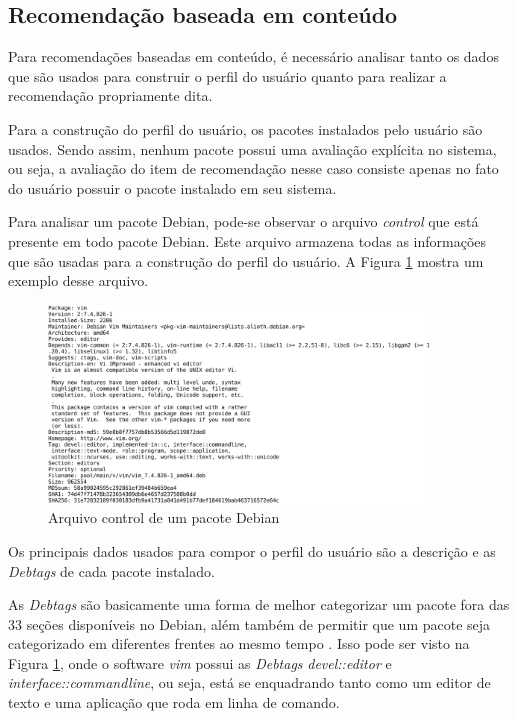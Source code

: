 \subsection{Recomendação baseada em conteúdo}

Para recomendações baseadas em conteúdo, é necessário analisar tanto os dados
que são usados para construir o perfil do usuário quanto para realizar a
recomendação propriamente dita.

Para a construção do perfil do usuário, os pacotes instalados pelo usuário são
usados. Sendo assim, nenhum pacote possui uma avaliação explícita no sistema,
ou seja, a avaliação do item de recomendação nesse caso consiste apenas no fato
do usuário possuir o pacote instalado em seu sistema.

Para analisar um pacote Debian, pode-se observar o arquivo \textit{control} que
está presente em todo pacote Debian. Este arquivo
armazena todas as informações que são usadas para a construção do perfil do
usuário. A Figura \ref{fig:control_pacote} mostra um exemplo desse arquivo.

\begin{figure}[h]
  \centering
  \includegraphics[width=0.9\textwidth]{figuras/control_pacote.eps}
  \caption{Arquivo control de um pacote Debian}
  \label{fig:control_pacote}
\end{figure}

Os principais dados usados para compor o perfil do usuário são a
descrição e as \textit{Debtags} de cada pacote instalado.

As \textit{Debtags} são basicamente uma forma de melhor categorizar um pacote fora das 33
seções disponíveis no Debian, além também de permitir que um pacote seja
categorizado em diferentes frentes ao mesmo tempo \cite{zini2005cute}. Isso pode ser visto na Figura
\ref{fig:control_pacote}, onde o software \textit{vim} possui as
\textit{Debtags} \textit{devel::editor} e \textit{interface::commandline}, ou seja, está se
enquadrando tanto como um editor de texto e uma aplicação que roda em linha de
comando.

